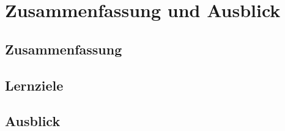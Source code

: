 \section{Zusammenfassung und Ausblick}

\subsection{Zusammenfassung}

\subsection{Lernziele}

\subsection{Ausblick}
